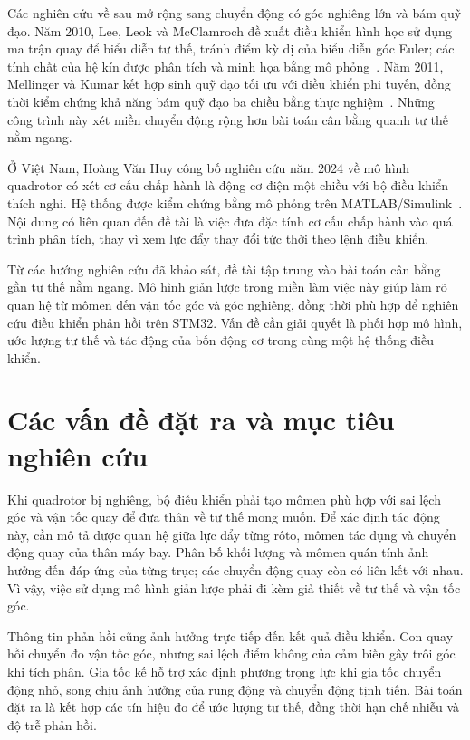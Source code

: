 Các nghiên cứu về sau mở rộng sang chuyển động có góc nghiêng lớn và bám quỹ đạo. Năm 2010, Lee, Leok và McClamroch đề xuất điều khiển hình học sử dụng ma trận quay để biểu diễn tư thế, tránh điểm kỳ dị của biểu diễn góc Euler; các tính chất của hệ kín được phân tích và minh họa bằng mô phỏng~\cite{lee2010geometric}. Năm 2011, Mellinger và Kumar kết hợp sinh quỹ đạo tối ưu với điều khiển phi tuyến, đồng thời kiểm chứng khả năng bám quỹ đạo ba chiều bằng thực nghiệm~\cite{mellinger2011minimum}. Những công trình này xét miền chuyển động rộng hơn bài toán cân bằng quanh tư thế nằm ngang.

Ở Việt Nam, Hoàng Văn Huy công bố nghiên cứu năm 2024 về mô hình quadrotor có xét cơ cấu chấp hành là động cơ điện một chiều với bộ điều khiển thích nghi. Hệ thống được kiểm chứng bằng mô phỏng trên MATLAB/Simulink~\cite{huy2024simulation}. Nội dung có liên quan đến đề tài là việc đưa đặc tính cơ cấu chấp hành vào quá trình phân tích, thay vì xem lực đẩy thay đổi tức thời theo lệnh điều khiển.

Từ các hướng nghiên cứu đã khảo sát, đề tài tập trung vào bài toán cân bằng gần tư thế nằm ngang. Mô hình giản lược trong miền làm việc này giúp làm rõ quan hệ từ mômen đến vận tốc góc và góc nghiêng, đồng thời phù hợp để nghiên cứu điều khiển phản hồi trên STM32. Vấn đề cần giải quyết là phối hợp mô hình, ước lượng tư thế và tác động của bốn động cơ trong cùng một hệ thống điều khiển.

\section{Các vấn đề đặt ra và mục tiêu nghiên cứu}
\label{sec:introduction-objectives}

Khi quadrotor bị nghiêng, bộ điều khiển phải tạo mômen phù hợp với sai lệch góc và vận tốc quay để đưa thân về tư thế mong muốn. Để xác định tác động này, cần mô tả được quan hệ giữa lực đẩy từng rôto, mômen tác dụng và chuyển động quay của thân máy bay. Phân bố khối lượng và mômen quán tính ảnh hưởng đến đáp ứng của từng trục; các chuyển động quay còn có liên kết với nhau. Vì vậy, việc sử dụng mô hình giản lược phải đi kèm giả thiết về tư thế và vận tốc góc.

Thông tin phản hồi cũng ảnh hưởng trực tiếp đến kết quả điều khiển. Con quay hồi chuyển đo vận tốc góc, nhưng sai lệch điểm không của cảm biến gây trôi góc khi tích phân. Gia tốc kế hỗ trợ xác định phương trọng lực khi gia tốc chuyển động nhỏ, song chịu ảnh hưởng của rung động và chuyển động tịnh tiến. Bài toán đặt ra là kết hợp các tín hiệu đo để ước lượng tư thế, đồng thời hạn chế nhiễu và độ trễ phản hồi.

